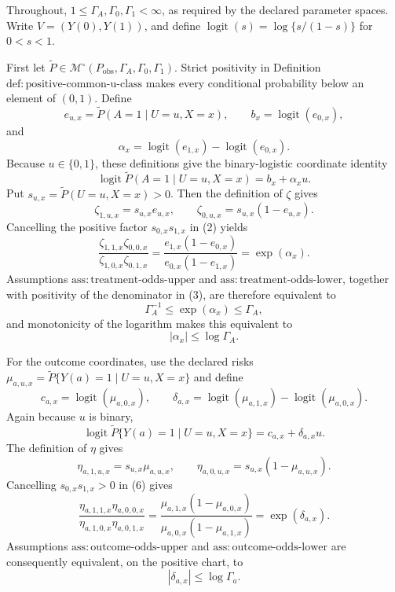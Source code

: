 Throughout, \(1\leq\Gamma_A,\Gamma_0,\Gamma_1<\infty\), as required by the declared parameter spaces.  Write \(V=(Y(0),Y(1))\), and define \(\operatorname{logit}(s)=\log\{s/(1-s)\}\) for \(0<s<1\).

First let \(\widetilde P\in\mathcal M^{\circ}(P_{\mathrm{obs}},\Gamma_A,\Gamma_0,\Gamma_1)\).  Strict positivity in Definition \(\mathrm{def{:}positive\text{-}common\text{-}u\text{-}class}\) makes every conditional probability below an element of \((0,1)\).  Define
\[
e_{u,x}=\widetilde P(A=1\mid U=u,X=x),
\qquad
b_x=\operatorname{logit}(e_{0,x}),
\]
and
\[
\alpha_x=\operatorname{logit}(e_{1,x})-
          \operatorname{logit}(e_{0,x}).
\]
Because \(u\in\{0,1\}\), these definitions give the binary-logistic coordinate identity
\[
\operatorname{logit}\widetilde P(A=1\mid U=u,X=x)
=b_x+\alpha_xu.                                           \tag{1}
\]
Put \(s_{u,x}=\widetilde P(U=u,X=x)>0\).  Then the definition of \(\zeta\) gives
\[
\zeta_{1,u,x}=s_{u,x}e_{u,x},
\qquad
\zeta_{0,u,x}=s_{u,x}(1-e_{u,x}).                         \tag{2}
\]
Cancelling the positive factor \(s_{0,x}s_{1,x}\) in (2) yields
\[
\frac{\zeta_{1,1,x}\zeta_{0,0,x}}
     {\zeta_{1,0,x}\zeta_{0,1,x}}
=\frac{e_{1,x}(1-e_{0,x})}{e_{0,x}(1-e_{1,x})}
=\exp(\alpha_x).                                          \tag{3}
\]
Assumptions \(\mathrm{ass{:}treatment\text{-}odds\text{-}upper}\) and \(\mathrm{ass{:}treatment\text{-}odds\text{-}lower}\), together with positivity of the denominator in (3), are therefore equivalent to
\[
\Gamma_A^{-1}\leq\exp(\alpha_x)\leq\Gamma_A,
\]
and monotonicity of the logarithm makes this equivalent to
\[
|\alpha_x|\leq\log\Gamma_A.                              \tag{4}
\]

For the outcome coordinates, use the declared risks
\(\mu_{a,u,x}=\widetilde P\{Y(a)=1\mid U=u,X=x\}\) and define
\[
c_{a,x}=\operatorname{logit}(\mu_{a,0,x}),
\qquad
\delta_{a,x}=\operatorname{logit}(\mu_{a,1,x})-
              \operatorname{logit}(\mu_{a,0,x}).
\]
Again because \(u\) is binary,
\[
\operatorname{logit}\widetilde P\{Y(a)=1\mid U=u,X=x\}
=c_{a,x}+\delta_{a,x}u.                                   \tag{5}
\]
The definition of \(\eta\) gives
\[
\eta_{a,1,u,x}=s_{u,x}\mu_{a,u,x},
\qquad
\eta_{a,0,u,x}=s_{u,x}(1-\mu_{a,u,x}).                   \tag{6}
\]
Cancelling \(s_{0,x}s_{1,x}>0\) in (6) gives
\[
\frac{\eta_{a,1,1,x}\eta_{a,0,0,x}}
     {\eta_{a,1,0,x}\eta_{a,0,1,x}}
=\frac{\mu_{a,1,x}(1-\mu_{a,0,x})}
       {\mu_{a,0,x}(1-\mu_{a,1,x})}
=\exp(\delta_{a,x}).                                     \tag{7}
\]
Assumptions \(\mathrm{ass{:}outcome\text{-}odds\text{-}upper}\) and \(\mathrm{ass{:}outcome\text{-}odds\text{-}lower}\) are consequently equivalent, on the positive chart, to
\[
|\delta_{a,x}|\leq\log\Gamma_a.                          \tag{8}
\]

